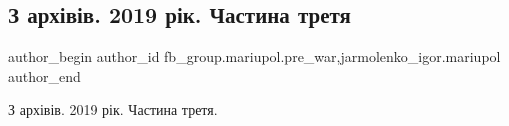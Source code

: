  
 
 
 
 

\subsection{З архівів. 2019 рік. Частина третя}
\label{sec:08_02_2023.fb.fb_group.mariupol.pre_war.1.z_arkh_v_v__2019_r_k}
 
\ifcmt
 author_begin
   author_id fb_group.mariupol.pre_war,jarmolenko_igor.mariupol
 author_end
\fi

З архівів. 2019 рік. Частина третя.

